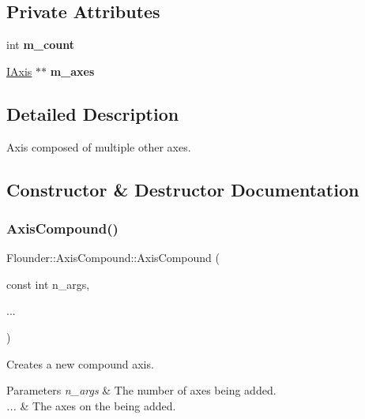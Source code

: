 \subsection*{Private Attributes}
\begin{DoxyCompactItemize}
\item 
\mbox{\label{class_flounder_1_1_axis_compound_a7215508cf797819812eb613f68e08e08}} 
int {\bfseries m\+\_\+count}
\item 
\mbox{\label{class_flounder_1_1_axis_compound_ae0190fea4ac3e3e9be3e8d8ef94ee64a}} 
\hyperlink{class_flounder_1_1_i_axis}{I\+Axis} $\ast$$\ast$ {\bfseries m\+\_\+axes}
\end{DoxyCompactItemize}


\subsection{Detailed Description}
Axis composed of multiple other axes. 



\subsection{Constructor \& Destructor Documentation}
\mbox{\label{class_flounder_1_1_axis_compound_a7532a7e6de5bf935a28d37e05a4c6cdc}} 
\subsubsection{\texorpdfstring{Axis\+Compound()}{AxisCompound()}}
{\footnotesize\ttfamily Flounder\+::\+Axis\+Compound\+::\+Axis\+Compound (\begin{DoxyParamCaption}\item[{const int}]{n\+\_\+args,  }\item[{}]{... }\end{DoxyParamCaption})}



Creates a new compound axis. 


\begin{DoxyParams}{Parameters}
{\em n\+\_\+args} & The number of axes being added. \\
\hline
{\em ...} & The axes on the being added. \\
\hline
\end{DoxyParams}
\mbox{\label{class_flounder_1_1_axis_compound_afc537fe10c02e1e2bd8d8d53d57ec26a}} 
